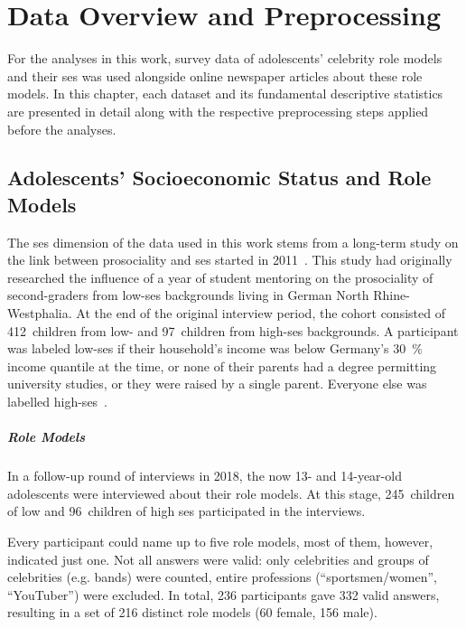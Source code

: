 \renewcommand{\imagepath}{../30-data/img}

\chapter{Data Overview and Preprocessing}\label{ch:data}
For the analyses in this work, survey data of adolescents' celebrity role models and their \gls{ses} was used alongside online newspaper articles about these role models. In this chapter, each dataset and its fundamental descriptive statistics are presented in detail along with the respective preprocessing steps applied before the analyses.

\section{Adolescents' Socioeconomic Status and Role Models}
The \gls{ses} dimension of the data used in this work stems from a long-term study on the link between prosociality and \gls{ses} started in 2011~\autocite{kosse_formation_2020}. This study had originally researched the influence of a year of student mentoring on the prosociality of second-graders from low-\gls{ses} backgrounds living in German North Rhine-Westphalia. At the end of the original interview period, the cohort consisted of \SI{412}{children} from low- and \SI{97}{children} from high-\gls{ses} backgrounds. A participant was labeled low-\gls{ses} if their household's income was below Germany's \SI{30}{\percent} income quantile at the time, or none of their parents had a degree permitting university studies, or they were raised by a single parent. Everyone else was labelled high-\gls{ses}~\autocite{kosse_formation_2020}.

\paragraph{Role Models}
In a follow-up round of interviews in 2018, the now 13- and 14-year-old adolescents were interviewed about their role models. At this stage, \SI{245}{children} of low and \SI{96}{children} of high \gls{ses} participated in the interviews.

Every participant could name up to five role models, most of them, however, indicated just one. Not all answers were valid: only celebrities and groups of celebrities (e.g. bands) were counted, entire professions (``sportsmen/women'', ``YouTuber'') were excluded. In total, \SI{236}{} participants gave \SI{332}{} valid answers, resulting in a set of \SI{216}{} distinct role models (\SI{60}{} female, \SI{156}{} male).

